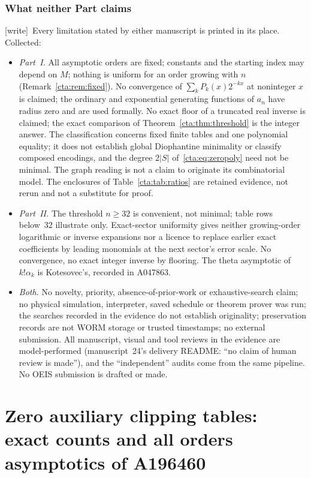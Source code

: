 \documentclass[11pt]{article}
\theoremstyle{definition}
\theoremstyle{remark}
\newcommand{\wtag}{\textup{[write]}}
\begin{document}
\section{What neither Part claims}\label{cta:sec:limits}

\wtag\ Every limitation stated by either manuscript is printed in its
place. Collected:
\begin{itemize}
\item \emph{Part~I.} All asymptotic orders are fixed; constants and the
starting index may depend on $M$; nothing is uniform for an order growing
with $n$ (Remark~\ref{cta:rem:fixed}). No convergence of
$\sum_kP_k(x)2^{-kx}$ at noninteger $x$ is claimed; the ordinary and
exponential generating functions of $a_n$ have radius zero and are used
formally. No exact floor of a truncated real inverse is claimed; the
exact comparison of Theorem~\ref{cta:thm:threshold} is the integer
answer. The classification concerns fixed finite tables and one polynomial
equality; it does not establish global Diophantine minimality or classify
composed encodings, and the degree $2|S|$ of~\eqref{cta:eq:zeropoly} need
not be minimal. The graph reading is not a claim to originate its
combinatorial model. The enclosures of Table~\ref{cta:tab:ratios} are
retained evidence, not rerun and not a substitute for proof.
\item \emph{Part~II.} The threshold $n\ge32$ is convenient, not minimal;
table rows below~32 illustrate only. Exact-sector uniformity gives neither
growing-order logarithmic or inverse expansions nor a licence to replace
earlier exact coefficients by leading monomials at the next sector's error
scale. No convergence, no exact integer inverse by flooring. The theta
asymptotic of $k!\alpha_k$ is Kotesovec's, recorded in A047863.
\item \emph{Both.} No novelty, priority, absence-of-prior-work or
exhaustive-search claim; no physical simulation, interpreter, saved
schedule or theorem prover was run; the searches recorded in the evidence
do not establish originality; preservation records are not WORM storage
or trusted timestamps; no external submission. All manuscript, visual and
tool reviews in the evidence are model-performed (manuscript~24's delivery
README: ``no claim of human review is made''), and the ``independent''
audits come from the same pipeline. No OEIS submission is drafted or made.
\end{itemize}

\part{Zero auxiliary clipping tables: exact counts and all orders asymptotics of A196460}\label{cta:part:one}
\end{document}
